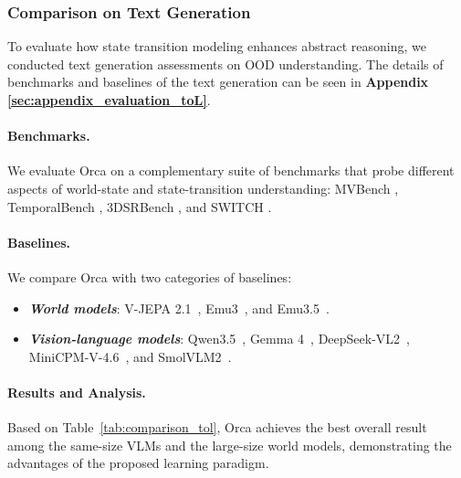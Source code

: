 \documentclass{llmxive}
\begin{document}
\subsubsection{Comparison on Text Generation}\label{sec:evaluation_toL}


To evaluate how state transition modeling enhances abstract reasoning, we conducted text generation assessments on OOD understanding.
The details of benchmarks and baselines of the text generation can be seen in \textbf{Appendix \ref{sec:appendix_evaluation_toL}}.

\paragraph{Benchmarks.} 
We evaluate Orca on a complementary suite of benchmarks that probe different aspects of world-state and state-transition understanding: 
MVBench \citep{MVBench}, TemporalBench \citep{cai2024temporalbench}, 3DSRBench \citep{ma20253dsrbench}, and SWITCH \citep{switch2025}.




\paragraph{Baselines.} We compare Orca with two categories of baselines:

\vspace{-2ex}
\begin{itemize}
    \item \textit{\textbf{World models}}: V-JEPA 2.1~\citep{V-JEPA-2.1}, Emu3~\citep{Emu3}, and Emu3.5~\citep{Emu35}.
    \item \textit{\textbf{Vision-language models}}: Qwen3.5~\citep{qwen35}, Gemma 4~\citep{Gemma4}, DeepSeek-VL2~\citep{DeepSeek-VL2}, MiniCPM-V-4.6~\citep{MiniCPM-o-4.5}, and SmolVLM2~\citep{SmolVLM}.
\end{itemize}




\paragraph{Results and Analysis.} 
Based on Table~\ref{tab:comparison_tol}, Orca achieves the best overall result among the same-size VLMs and the large-size world models, demonstrating the advantages of the proposed learning paradigm.
\end{document}
